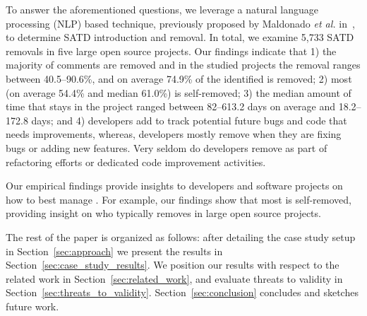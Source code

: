To answer the aforementioned questions, we leverage a natural language processing (NLP) based technique, previously proposed by Maldonado \emph{et al.} in~\cite{Maldonado2015TSE}, to determine SATD introduction and removal. In total, we examine 5,733 SATD removals in five large open source projects. Our findings indicate that 1) the majority of \SATD comments are removed and in the studied projects the removal ranges between 40.5--90.6\%, and on average 74.9\% of the identified \SATD is removed; 2) most \SATD (on average 54.4\% and median 61.0\%) is self-removed; 3) the median amount of time that \SATD stays in the project ranged between 82--613.2 days on average and 18.2--172.8 days; and 4) developers add \SATD to track potential future bugs and code that needs improvements, whereas, developers mostly remove \SATD when they are fixing bugs or adding new features. Very seldom do developers remove \SATD as part of refactoring efforts or dedicated code improvement activities.

Our empirical findings provide insights to developers and software projects on how to best manage \SATD. For example, our findings show that most \SATD is self-removed, providing insight on who typically removes \SATD in large open source projects.


The rest of the paper is organized as follows: after detailing the case study setup in Section~\ref{sec:approach} we present the results in Section~\ref{sec:case_study_results}. We position our results with respect to the related work in Section~\ref{sec:related_work}, and evaluate threats to validity in Section~\ref{sec:threats_to_validity}.  Section~\ref{sec:conclusion} concludes and sketches future work.






